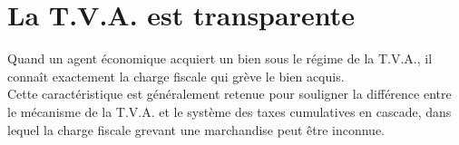 \documentclass{book}
\begin{document}
\section{La T.V.A. est transparente}

Quand un agent économique acquiert un bien sous le régime de la T.V.A., il connaît
exactement la charge fiscale qui grève le bien acquis.\\

Cette caractéristique est généralement retenue pour souligner la différence entre le mécanisme
de la T.V.A. et le système des taxes cumulatives en cascade, dans lequel la charge fiscale
grevant une marchandise peut être inconnue.\\























   
\nocite{*}

\end{document}
